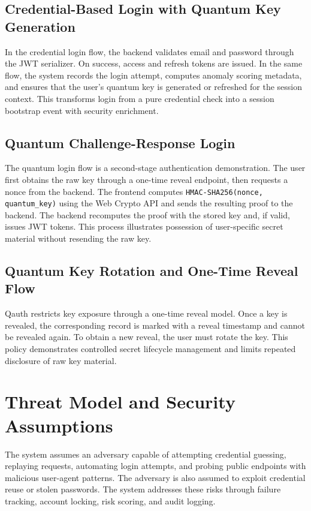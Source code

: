 \subsection{Credential-Based Login with Quantum Key Generation}
In the credential login flow, the backend validates email and password through the JWT serializer. On success, access and refresh tokens are issued. In the same flow, the system records the login attempt, computes anomaly scoring metadata, and ensures that the user's quantum key is generated or refreshed for the session context. This transforms login from a pure credential check into a session bootstrap event with security enrichment.

\subsection{Quantum Challenge-Response Login}
The quantum login flow is a second-stage authentication demonstration. The user first obtains the raw key through a one-time reveal endpoint, then requests a nonce from the backend. The frontend computes \texttt{HMAC-SHA256(nonce, quantum\_key)} using the Web Crypto API and sends the resulting proof to the backend. The backend recomputes the proof with the stored key and, if valid, issues JWT tokens. This process illustrates possession of user-specific secret material without resending the raw key.

\subsection{Quantum Key Rotation and One-Time Reveal Flow}
Qauth restricts key exposure through a one-time reveal model. Once a key is revealed, the corresponding record is marked with a reveal timestamp and cannot be revealed again. To obtain a new reveal, the user must rotate the key. This policy demonstrates controlled secret lifecycle management and limits repeated disclosure of raw key material.

\section{Threat Model and Security Assumptions}
The system assumes an adversary capable of attempting credential guessing, replaying requests, automating login attempts, and probing public endpoints with malicious user-agent patterns. The adversary is also assumed to exploit credential reuse or stolen passwords. The system addresses these risks through failure tracking, account locking, risk scoring, and audit logging.

